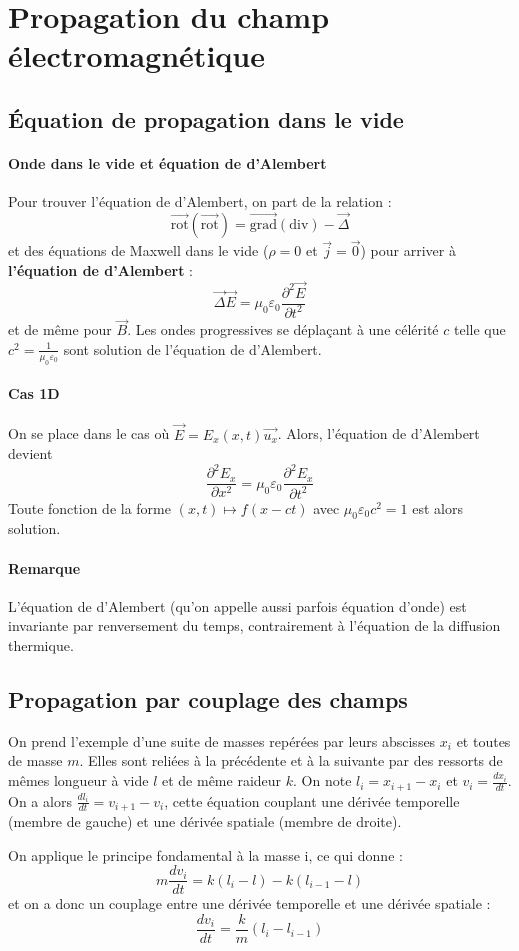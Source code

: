 \documentclass[french]{book}
\theoremstyle{plain}
\theoremstyle{definition}
\theoremstyle{remark}
\newcommand{\grad}{\overrightarrow{\text{grad}}}
\newcommand{\rot}{\overrightarrow{\text{rot}}}
\renewcommand{\div}{\text{div}}
\begin{document}
\section{Propagation du champ électromagnétique}
\subsection{Équation de propagation dans le vide}
\paragraph{Onde dans le vide et équation de d'Alembert} Pour trouver l'équation de d'Alembert, on part de la relation : $$\rot\left(\rot\right)=\grad\left(\div\right)-\overrightarrow{\Delta}$$ et des équations de Maxwell dans le vide ($\rho=0$ et $\overrightarrow{j}=\overrightarrow{0}$) pour arriver à \textbf{l'équation de d'Alembert} : $$\overrightarrow{\Delta}\overrightarrow{E}=\mu_0\varepsilon_0\frac{\partial^2\overrightarrow{E}}{\partial t^2}$$ et de même pour $\overrightarrow{B}$. Les ondes progressives se déplaçant à une célérité $c$ telle que $c^2=\displaystyle\frac{1}{\mu_0\varepsilon_0}$ sont solution de l'équation de d'Alembert.
\paragraph{Cas 1D} On se place dans le cas où $\overrightarrow{E}=E_x(x,t)\overrightarrow{u_x}$. Alors, l'équation de d'Alembert devient $$\frac{\partial^2 E_x}{\partial x^2}=\mu_0\varepsilon_0\frac{\partial^2 E_x}{\partial t^2}$$ Toute fonction de la forme $(x,t)\mapsto f(x-ct)$ avec $\mu_0\varepsilon_0c^2=1$ est alors solution. 
\paragraph{Remarque} L'équation de d'Alembert (qu'on appelle aussi parfois équation d'onde) est invariante par renversement du temps, contrairement à l'équation de la diffusion thermique.
\subsection{Propagation par couplage des champs}
On prend l'exemple d'une suite de masses repérées par leurs abscisses $x_i$ et toutes de masse $m$. Elles sont reliées à la précédente et à la suivante par des ressorts de mêmes longueur à vide $l$ et de même raideur $k$. On note $l_i=x_{i+1}-x_i$ et $\displaystyle v_i=\frac{dx_i}{dt}$. On a alors $\displaystyle\frac{dl_i}{dt}=v_{i+1}-v_i$, cette équation couplant une dérivée temporelle (membre de gauche) et une dérivée spatiale (membre de droite). \\ \par On applique le principe fondamental à la masse i, ce qui donne : $$m\frac{dv_i}{dt}=k(l_i-l)-k(l_{i-1}-l)$$ et on a donc un couplage entre une dérivée temporelle et une dérivée spatiale : $$\frac{dv_i}{dt}=\frac{k}{m}\left(l_i-l_{i-1}\right)$$
\end{document}
